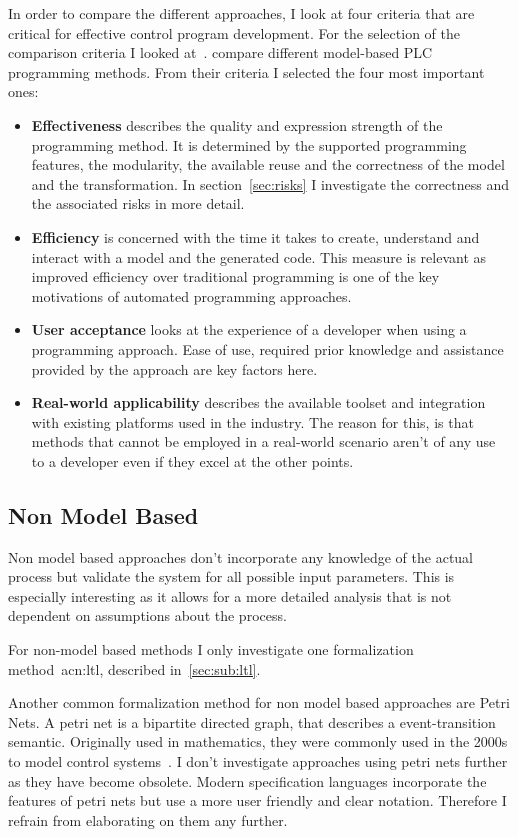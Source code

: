In order to compare the different approaches, I look at four criteria that are critical for effective control program development.
For the selection of the comparison criteria I looked at~\cite{VH:2014}.
\citeauthor{VH:2014} compare different model-based PLC programming methods.
From their criteria I selected the four most important ones:
\begin{itemize}
	\item \textbf{Effectiveness} describes the quality and expression strength of the programming method.
	It is determined by the supported programming features, the modularity, the available reuse and the correctness of the model and the transformation.
	In section~\ref{sec:risks} I investigate the correctness and the associated risks in more detail.
	\item \textbf{Efficiency} is concerned with the time it takes to create, understand and interact with a model and the generated code.
	This measure is relevant as improved efficiency over traditional programming is one of the key motivations of automated programming approaches.
	\item \textbf{User acceptance} looks at the experience of a developer when using a programming approach.
	Ease of use, required prior knowledge and assistance provided by the approach are key factors here.
	\item \textbf{Real-world applicability} describes the available toolset and integration with existing platforms used in the industry.
	The reason for this, is that methods that cannot be employed in a real-world scenario aren't of any use to a developer even if they excel at the other points.
\end{itemize}

\subsection{Non Model Based}
\label{sec:non_model}

Non model based approaches don't incorporate any knowledge of the actual process but validate the system for all possible input parameters.
This is especially interesting as it allows for a more detailed analysis that is not dependent on assumptions about the process.

For non-model based methods I only investigate one formalization method~\acrlong{acn:ltl}, described in~\ref{sec:sub:ltl}.

Another common formalization method for non model based approaches are Petri Nets.
A petri net is a bipartite directed graph, that describes a event-transition semantic.
Originally used in mathematics, they were commonly used in the 2000s to model control systems~\cite{Frey:2000:2, Frey:2000aa}.
I don't investigate approaches using petri nets further as they have become obsolete.
Modern specification languages incorporate the features of petri nets but use a more user friendly and clear notation.
Therefore I refrain from elaborating on them any further.

